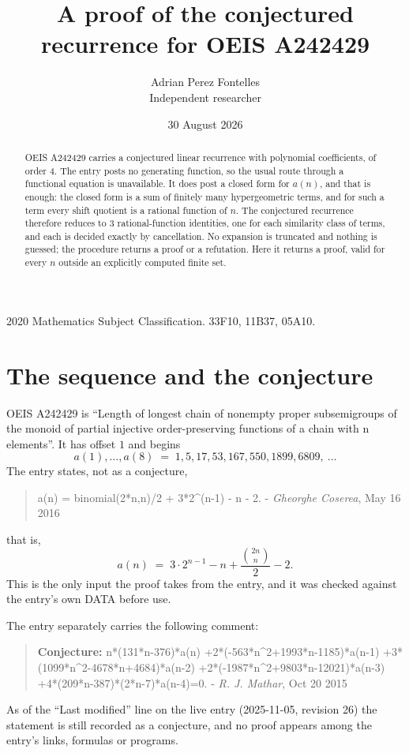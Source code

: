 \documentclass[11pt,a4paper]{article}
\title{A proof of the conjectured recurrence for OEIS A242429}
\author{Adrian Perez Fontelles\\ \small Independent researcher}
\date{30 August 2026}
\theoremstyle{plain}
\theoremstyle{definition}
\begin{document}
\maketitle

\begin{abstract}
OEIS A242429 carries a conjectured linear recurrence with polynomial coefficients, of
order 4. The entry posts no generating function, so the usual route through a
functional equation is unavailable. It does post a closed form for $a(n)$, and that is
enough: the closed form is a sum of finitely many hypergeometric terms, and for such a
term every shift quotient is a rational function of $n$. The conjectured recurrence
therefore reduces to 3 rational-function identities, one for each similarity
class of terms, and each is decided exactly by cancellation. No expansion is truncated and
nothing is guessed; the procedure returns a proof or a refutation. Here it returns a proof,
valid for every $n$ outside an explicitly computed finite set.
\end{abstract}

\noindent\small 2020 Mathematics Subject Classification. 33F10, 11B37, 05A10.\normalsize

\section{The sequence and the conjecture}

OEIS A242429 is ``Length of longest chain of nonempty proper subsemigroups of the monoid of partial injective order-preserving functions of a chain with n elements''. It has offset $1$ and begins
\[
a(1),\dots,a(8)\;=\;1, 5, 17, 53, 167, 550, 1899, 6809,\ \dots
\]
The entry states, not as a conjecture,
\begin{quote}\small
a(n) = binomial(2*n,n)/2 + 3*2\^{}(n-1) - n - 2. - \emph{Gheorghe Coserea}, May 16 2016
\end{quote}
that is,
\begin{equation}\label{eq:cf}
a(n)\;=\;3 \cdot 2^{n - 1} - n + \frac{{\binom{2 n}{n}}}{2} - 2 .
\end{equation}
This is the only input the proof takes from the entry, and it was checked against the
entry's own DATA before use.

The entry separately carries the following comment:
\begin{quote}\small
\textbf{Conjecture:} n*(131*n-376)*a(n) +2*(-563*n\^{}2+1993*n-1185)*a(n-1) +3*(1099*n\^{}2-4678*n+4684)*a(n-2) +2*(-1987*n\^{}2+9803*n-12021)*a(n-3) +4*(209*n-387)*(2*n-7)*a(n-4)=0. - \emph{R. J. Mathar}, Oct 20 2015
\end{quote}
As of the ``Last modified'' line on the live entry (2025-11-05, revision 26) the
statement is still recorded as a conjecture, and no proof appears among the entry's links,
formulas or programs.
\end{document}

